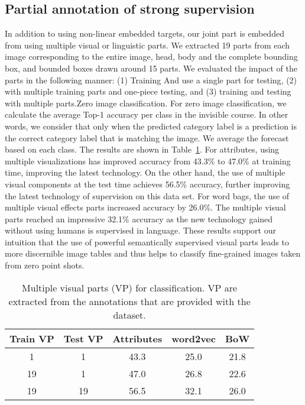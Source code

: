 \documentclass[10pt,twocolumn,letterpaper]{article}
\begin{document}
\subsection{Partial annotation of strong supervision}
In addition to using non-linear embedded targets, our joint part is embedded from using multiple visual or linguistic parts. We extracted 19 parts from each image corresponding to the entire image, head, body and the complete bounding box\cite{Zhang_2014_Partbased}, and bounded boxes drawn around 15 parts. We evaluated the impact of the parts in the following manner: (1) Training And use a single part for testing, (2) with multiple training parts and one-piece testing, and (3) training and testing with multiple parts.Zero image classification. For zero image classification, we calculate the average Top-1 accuracy per class in the invisible course. In other words, we consider that only when the predicted category label is a prediction is the correct category label that is matching the image. We average the forecast based on each class. The results are shown in Table~\ref{table1}. For attributes, using multiple visualizations has improved accuracy from 43.3\% to 47.0\% at training time, improving the latest technology. On the other hand, the use of multiple visual components at the test time achieves 56.5\% accuracy, further improving the latest technology of supervision on this data set. For word bags, the use of multiple visual effects parts increased accuracy by 26.0\%. The multiple visual parts reached an impressive 32.1\% accuracy as the new technology gained without using humans is supervised in language. These results support our intuition that the use of powerful semantically supervised visual parts leads to more discernible image tables and thus helps to classify fine-grained images taken from zero point shots.
\begin{table}[h]%
	\centering 
	\caption{ Multiple visual parts (VP) for classification. VP
		are extracted from the annotations that are provided with the
		dataset.}\label{table1}
	\tabcolsep 0.1in 
	\begin{tabular} {|c|c|c|c|c|}
		\hline
	Train VP &Test VP & Attributes& word2vec&BoW\\
	\hline
		1& 1 &43.3&25.0&21.8\\
			\hline	
		19 & 1&47.0&26.8&22.6\\
			\hline
		19 & 19 & 56.5& 32.1&26.0\\
			\hline
	\end{tabular}
\end{table}
\end{document}
